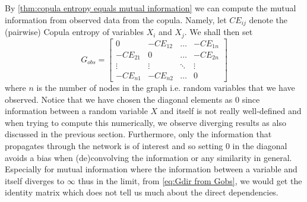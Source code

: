 \documentclass[../Thesis.tex]{subfiles}
\begin{document}
By \autoref{thm:copula entropy equals mutual information} we can compute the mutual information from observed data from the copula. Namely, let $CE_{ij}$ denote the (pairwise) Copula entropy of variables $X_i$ and $X_j$. We shall then set
\begin{equation}\label{eq:Gobs matrix}
    G_{obs} = \begin{bmatrix}
        0        & - CE_{12} & \dots  & - CE_{1n} \\
        -CE_{21} & 0         & \dots  & - CE_{2n} \\
        \vdots   & \vdots    & \ddots & \vdots    \\
        -CE_{n1} & -CE_{n2}  & \dots  & 0
    \end{bmatrix}
\end{equation}
where $n$ is the number of nodes in the graph i.e. random variables that we have observed. Notice that we have chosen the diagonal elements as $0$ since information between a random variable $X$ and itself is not really well-defined and when trying to compute this numerically, we observe diverging results as also discussed in the previous section. Furthermore, only the information that propagates through the network is of interest and so setting $0$ in the diagonal avoids a bias when (de)convolving the information or any similarity in general. Especially for mutual information where the information between a variable and itself diverges to $\infty$ thus in the limit, from \autoref{eq:Gdir from Gobs}, we would get the identity matrix which does not tell us much about the direct dependencies.
\end{document}
